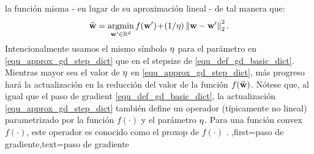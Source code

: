 {{ la función misma - en lugar de su aproximación lineal - de tal manera que:
 \begin{align} 
 \label{equ_approx_gd_step_dict}
 \widehat{{\bf w}} = \operatorname*{argmin}_{{\bf w}' \in \mathbb{R}^{d}} f({\bf w}')\!+\!(1/\eta)\left\Vert {{\bf w}-{\bf w}'} \right\Vert_{2}^2. 
 \end{align}
 Intencionalmente usamos el mismo símbolo $\eta$ para el parámetro en \eqref{equ_approx_gd_step_dict} 
 que en el \gls{stepsize} de \eqref{equ_def_gd_basic_dict}. Mientras mayor sea el valor de $\eta$ en 
 \eqref{equ_approx_gd_step_dict}, más progreso hará la actualización en la reducción del valor de la función $f(\widehat{{\bf w}})$. 
 Nótese que, al igual que el paso de \gls{gradient}  \eqref{equ_def_gd_basic_dict}, 
 la actualización \eqref{equ_approx_gd_step_dict} también define un operador (típicamente no lineal)  
 parametrizado por la función $f(\cdot)$ y el parámetro $\eta$. Para una función \gls{convex}  
 $f(\cdot)$, este operador es conocido como el \gls{proxop} de $f(\cdot)$ \cite{ProximalMethods}. 
 },first={paso de gradiente},text={paso de gradiente}}


